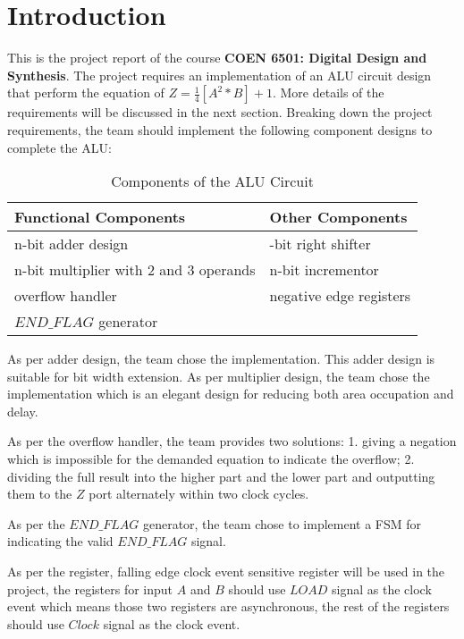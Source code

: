 \section{Introduction}

This is the project report of the course \textbf{COEN 6501: Digital Design and Synthesis}.
The project requires an implementation of an ALU circuit design that perform the equation of \textbf{\(Z = \frac{1}{4} [A^2\ast B] + 1\)}.
More details of the requirements will be discussed in the next section.
Breaking down the project requirements, the team should implement the following component designs to complete the ALU:

\begin{table}[!ht]
	\renewcommand{\arraystretch}{0.8}
	\caption{Components of the ALU Circuit}
	\centering
	\begin{tabular}{ >{\centering\arraybackslash}p{7cm} >{\centering\arraybackslash}p{7cm} }
		\hline
		\bfseries Functional Components        & \bfseries Other Components \\
		\hline
		n-bit adder design                     & 2-bit right shifter        \\
		n-bit multiplier with 2 and 3 operands & n-bit incrementor          \\
		overflow handler                       & negative edge registers    \\
		\(END\_FLAG\) generator                &                            \\
		\hline
	\end{tabular}
	\label{tb:cac}
\end{table}

As per adder design, the team chose the \textbf{} implementation.
This adder design is suitable for bit width extension.
As per multiplier design, the team chose the \textbf{} implementation
which is an elegant design for reducing both area occupation and delay.

As per the overflow handler, the team provides two solutions:
1. giving a negation which is impossible for the demanded equation to indicate the overflow;
2. dividing the full result into the higher part and the lower part and outputting them to the \(Z\) port alternately within two clock cycles.

As per the \(END\_FLAG\) generator, the team chose to implement a FSM for indicating the valid \(END\_FLAG\) signal.

As per the register, falling edge clock event sensitive register will be used in the project,
the registers for input \(A\) and \(B\) should use \(LOAD\) signal as the clock event which means those two registers are asynchronous,
the rest of the registers should use \(Clock\) signal as the clock event.

